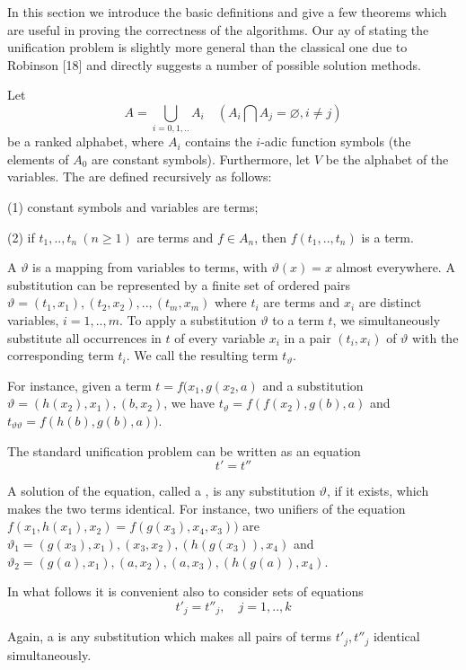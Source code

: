 
In this section we introduce the basic definitions and give a few theorems which
are useful in proving the correctness of the algorithms. Our ay of stating the
unification problem is slightly more general than the classical one due to
Robinson [18] and directly suggests a number of possible solution methods.

Let
\[A= \bigcup_{i=0,1,..} A_i \quad (A_i \bigcap A_j = \varnothing, i \neq j)\] be
a ranked alphabet, where $A_i$ contains the $i$-adic function symbols
(the elements of $A_0$ are constant symbols). Furthermore, let $V$ be the
alphabet of the variables.
The  are defined recursively as follows:

(1) constant symbols and variables are terms;

(2) if $t_1,..,t_n \ (n \geq 1)$ are terms and $f \in A_n$,
then $f(t_1,..,t_n)$ is a term.

A  $\vartheta$ is a mapping from variables to terms,
with $\vartheta(x)=x$ almost everywhere. A substitution can be represented
by a finite set of ordered pairs
$\vartheta={(t_1,x_1),(t_2,x_2),..,(t_m,x_m)}$
where $t_i$ are terms and $x_i$ are distinct variables,
$i = 1,..,m$. To apply a substitution $\vartheta$ to a term $t$, we
simultaneously substitute all occurrences in $t$ of every variable $x_i$ in a
pair $(t_i, x_i)$ of $\vartheta$ with the corresponding term $t_i$. We call the
resulting term $t_\vartheta$.

For instance, given a term $t = f(x_1, g(x_2, a)$ and a substitution 
$\vartheta = {(h(x_2),x_1),(b,x_2)}$, 
we have $t_\vartheta = f(f(x_2),g(b),a)$ and $t_{\vartheta\vartheta} =
f(h(b),g(b),a))$.

The standard unification problem can be written as an equation \[t'=t''\]

A solution of the equation, called a , is any substitution
$\vartheta$, if it exists, which makes the two terms identical. For instance,
two unifiers of the equation $f(x_1,h(x_1),x_2)=f(g(x_3),x_4,x_3))$ are
$\vartheta_1={(g(x_3),x_1),(x_3,x_2),(h(g(x_3)),x_4)}$ and
$\vartheta_2={(g(a),x_1),(a,x_2),(a,x_3),(h(g(a)),x_4)}$.

In what follows it is convenient also to consider sets of equations
\[t'_j=t''_j, \quad j=1,..,k\]

Again, a  is any substitution which makes all pairs of terms
$t'_j,t''_j$ identical simultaneously.

